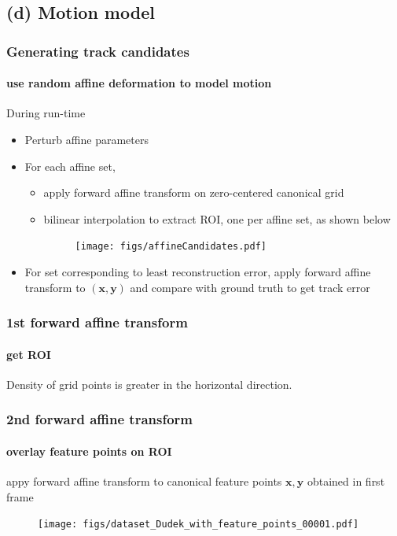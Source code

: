 \subsection{(d) Motion model}
\begin{frame}
\frametitle{Generating track candidates}
\framesubtitle{use random affine deformation to model motion}
\logoCSIPCPL\mypagenum
During run-time
\begin{itemize}
\item Perturb affine parameters
\item For each affine set, 
\begin{itemize}
\item apply forward affine transform on zero-centered canonical grid 
\item bilinear interpolation to extract ROI, one per affine set, as shown below
\begin{figure}[t]
\centering
\texttt{[image: figs/affineCandidates.pdf]}
\label{Fig:affine_candidates}
\end{figure}
\end{itemize}
\item For set corresponding to least reconstruction error, apply forward affine transform to $(\mathbf{x, y})$ and compare with ground truth to get track error
\end{itemize}
\end{frame}








\begin{frame}[plain]
\frametitle{1st forward affine transform}
\framesubtitle{get ROI}
\logoCSIPCPL\mypagenum
\begin{changemargin}{-1.3in}{0in}
Density of grid points is greater in the horizontal direction.
\begin{figure}[t]
\centering
{}
\end{figure}
\end{changemargin}
\end{frame}


\begin{frame}
\frametitle{2nd forward affine transform}
\framesubtitle{overlay feature points on ROI}
appy forward affine transform to canonical feature points $\mathbf{x,y}$ obtained in first frame
\logoCSIPCPL\mypagenum
\scriptsize
\begin{figure}[t]
\centering
\texttt{[image: figs/dataset\_Dudek\_with\_feature\_points\_00001.pdf]}
\label{Fig:overall}
\end{figure}
\end{frame}


